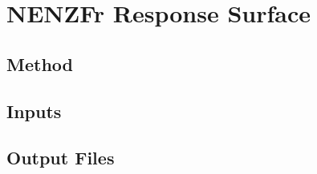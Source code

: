 
\newpage
\section{NENZFr Response Surface}
\label{chapter-response-surface}

\subsection{Method}

\subsection{Inputs}

\subsection{Output Files}